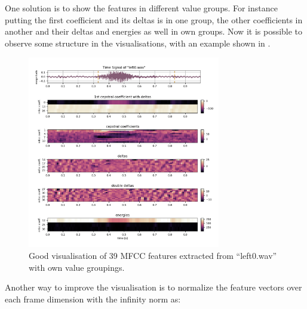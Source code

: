 

One solution is to show the features in different value groups. 
For instance putting the first coefficient and its deltas is in one group, the other coefficients in another and their deltas and energies as well in own groups. 
Now it is possible to observe some structure in the visualisations, with an example shown in .

\begin{figure}[!ht]
  \centering
    \includegraphics[width=0.75\textwidth]{./3_signal/figs/signal_mfcc_left0_norm0.png}
  \caption{Good visualisation of 39 MFCC features extracted from \enquote{left0.wav} with own value groupings.}
  \label{fig:left0_order}
\end{figure}
\FloatBarrier
\noindent
Another way to improve the visualisation is to normalize the feature vectors over each frame dimension with the infinity norm as:

